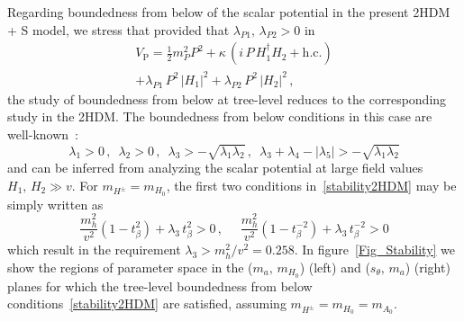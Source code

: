     Regarding boundedness from below of the scalar potential in the present 2HDM + S model, we stress that provided that 
    $\lambda_{P1}, \, \lambda_{P2} > 0$ in
    \begin{eqnarray}
     V_{\mathrm{P}} = \frac{1}{2} m_{P}^2 P^2 + \kappa\, (i \,P\, H_1^{\dagger}H_2 + \mathrm{h.c.}) \nonumber \\
            + \lambda_{P1} \,P^2\, \left|H_1\right|^2 + \lambda_{P2} \,P^2 \,\left|H_2\right|^2 \, ,\nonumber
    \end{eqnarray}
    the study of boundedness from below at tree-level reduces to the corresponding study in the 2HDM. The boundedness from below conditions 
    in this case are well-known~\cite{Gunion:2002zf}:
    \begin{equation}
    \label{stability2HDM}
     \lambda_1 > 0\,, \,\,\, \lambda_2 > 0\,, \,\,\, \lambda_3 > - \sqrt{\lambda_1 \lambda_2} \,, \,\,\, \lambda_3 + \lambda_4 - |\lambda_5| > - \sqrt{\lambda_1 \lambda_2} 
    \end{equation}
    and can be inferred from analyzing the scalar potential at large field values $H_1,\,H_2 \gg v$. For $m_{H^{\pm}} = m_{H_0}$, the first two conditions 
    in~\eqref{stability2HDM} may be simply written as
    \begin{equation}
     \frac{m_h^2}{v^2} (1-t_{\beta}^{2}) + \lambda_3 \, t_{\beta}^{2} > 0\,, \quad\,\, \frac{m_h^2}{v^2} (1-t_{\beta}^{-2}) + \lambda_3 \, t_{\beta}^{-2} > 0
     \end{equation}
    which result in the requirement $\lambda_3 > m_h^2/v^2 = 0.258$. In figure~\ref{Fig_Stability} we show the regions of parameter space in the 
    ($m_a,\, m_{H_0}$) (left) and ($s_{\theta},\, m_a$) (right) planes for which the tree-level boundedness from below conditions~\ref{stability2HDM}
    are satisfied, assuming $m_{H^{\pm}} = m_{H_0} = m_{A_0}$.
